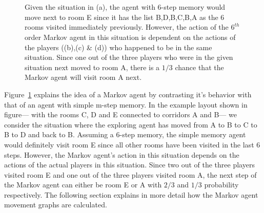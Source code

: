 \begin{figure}[!t]
\centering
    \hspace{1pt}
    \\
    \hspace{1pt}
    \\
    \hspace{1pt}
    \caption[Markov Data Explanation]{Given the situation in (a), the agent with 6-step memory would move next to room E since it has the list {B,D,B,C,B,A} as the 6 rooms visited immediately previously. However, the action of the $6^{th}$ order Markov agent in this situation is dependent on the actions of the players ((b),(c) \& (d)) who happened to be in the same situation. Since one out of the three players who were in the given situation next moved to room A, there is a $1/3$ chance that the Markov agent will visit room A next.}
    \label{fig:markovExample}
\end{figure}


Figure~\ref{fig:markovExample} explains the idea of a Markov agent by contrasting it's behavior with that of an agent with simple m-step memory. In the example layout shown in figure--- with the rooms C, D and E connected to corridors A and B--- we consider the situation where the exploring agent has moved from A to B to C to B to D and back to B. Assuming a 6-step memory, the simple memory agent would definitely visit room E since all other rooms have been visited in the last 6 steps. However, the Markov agent's action in this situation depends on the actions of the actual players in this situation. Since two out of the three players visited room E and one out of the three players visited room A, the next step of the Markov agent can either be room E or A with $2/3$ and $1/3$ probability respectively. The following section explains in more detail how the Markov agent movement graphs are calculated.

